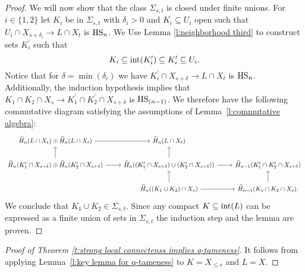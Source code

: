 \begin{proof}
	We will now show that the class $\Sigma_{s,t}$ is closed under finite unions.
	For $i \in \{1, 2\}$ let $K_i$ be in $\Sigma_{s,t}$ with $\delta_i > 0$ and $K_i \subseteq U_i$ open such that $U_{i} \cap X_{s+\delta_i} \to L \cap X_{t}$ is $\mathrm{HS}_n$.
	We Use Lemma \ref{l:neighborhood third} to construct sets $K_i^\prime$ such that
	\begin{equation*}
	K_i \subseteq \operatorname{int}(K_i^\prime) \subseteq K_i^\prime \subseteq U_i.
	\end{equation*}
	Notice that for $\delta = \min(\delta_i)$ we have $K_i^\prime \cap X_{s+\delta} \to L \cap X_t$ is $\mathrm{HS}_n$.
	Additionally, the induction hypothesis implies that $K_1 \cap K_2 \cap X_s \to K_1^\prime \cap K_2^\prime \cap X_{s+\delta}$ is $\mathrm{HS}_{(n-1)}$.
	We therefore have the following commutative diagram satisfying the assumptions of Lemma~\ref{l:commutative algebra}:
	\begin{equation*}
	\begin{tikzcd}
	\H_n(L \cap X_t) \oplus \H_n(L \cap X_t) \arrow[r] &
	\H_n(L \cap X_t) & \\
	\H_{n}(K_1^\prime \cap X_{s+\delta}) \oplus \H_n(K_2^\prime \cap X_{s+\delta}) \arrow[r] \arrow[u] & 
	\H_{n}((K_1^\prime \cap X_{s+\delta}) \cup (K_2^\prime \cap X_{s+\delta})) \arrow[r] \arrow[u] &
	\H_{n-1}(K_1^\prime \cap K_2^\prime \cap X_{s+\delta}) \\ & 
	\H_{n}((K_1 \cup K_2) \cap X_s) \arrow[r] \arrow[u] &
	\H_{n-1}(K_1 \cap K_2 \cap X_s). \arrow[u]
	\end{tikzcd}
	\end{equation*}
	We conclude that $K_1 \cup K_2 \in \Sigma_{s, t}$.
	Since any compact $K \subseteq \operatorname{int}(L)$ can be expressed as a finite union of sets in $\Sigma_{s,t}$ the induction step and the lemma are proven.
\end{proof}

\begin{proof}[Proof of Theorem \ref{t:strong local connectenss implies q-tameness}]
	It follows from applying Lemma~\ref{l:key lemma for q-tameness} to $K = X_{\leq s}$ and $L = X$.
\end{proof}